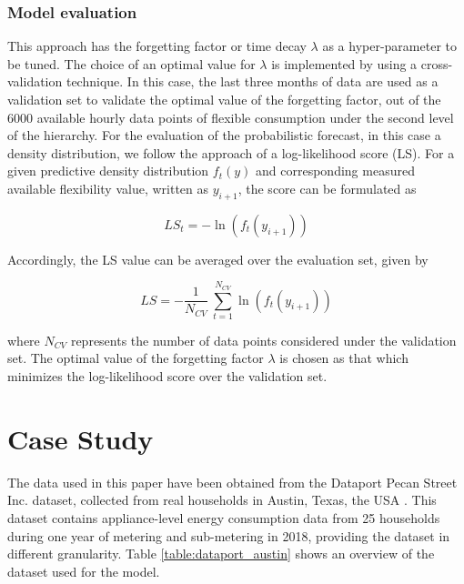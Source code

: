 \subsubsection{Model evaluation}
This approach has the forgetting factor or time decay $\lambda$ as a hyper-parameter to be tuned. The choice of an optimal value for $\lambda$ is implemented by using a cross-validation technique. In this case, the last three months of data are used as a validation set to validate the optimal value of the forgetting factor, out of the 6000 available hourly data points of flexible consumption under the second level of the hierarchy. For the evaluation of the probabilistic forecast, in this case a density distribution, we follow the approach of a log-likelihood score (LS). For a given predictive density distribution $f_{t}(y)$ and corresponding measured available flexibility value, written as $y_{i+1}$, the score can be formulated as

\begin{equation}
    LS_{t} = - \ln \left(f_{t}(y_{i+1})\right)
\end{equation}

Accordingly, the LS value can be averaged over the evaluation set, given by 

\begin{equation}
    LS = - \frac{1}{N_{CV}} \ \sum_{t=1}^{N_{CV}} \ln \left(f_{t}(y_{i+1})\right)
\end{equation}

where $N_{CV}$ represents the number of data points considered under the validation set.
The optimal value of the forgetting factor $\lambda$ is chosen as that which minimizes the log-likelihood score  over the validation set. 

\section{Case Study} \label{Sect:CaseStudy}
The data used in this paper have been obtained from the Dataport Pecan Street Inc. dataset, collected from real households in Austin, Texas, the USA \cite{PecanStreetInc}. This dataset contains appliance-level energy consumption data from 25 households during one year of metering and sub-metering in 2018, providing the dataset in different granularity. Table \ref{table:dataport_austin} shows an overview of the dataset used for the model.



